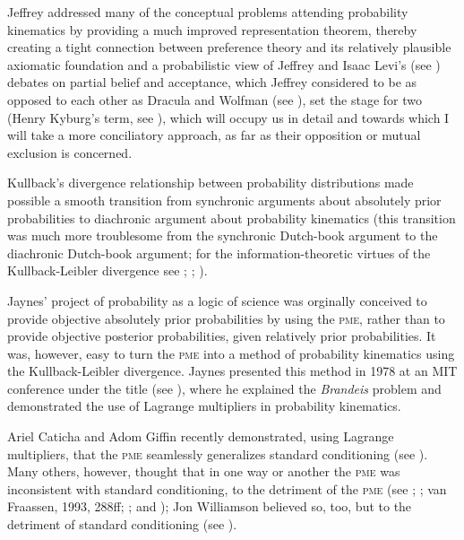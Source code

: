 \documentclass[11pt]{article}
\begin{document}
Jeffrey addressed many of the conceptual problems attending
probability kinematics by providing a much improved representation
theorem, thereby creating a tight connection between preference theory
and its relatively plausible axiomatic foundation and a probabilistic
view of  Jeffrey and Isaac Levi's (see
) debates on partial belief and acceptance, which
Jeffrey considered to be as opposed to each other as Dracula and
Wolfman (see ), set the stage for two
 (Henry Kyburg's term, see
), which will occupy us in detail and towards
which I will take a more conciliatory approach, as far as their
opposition or mutual exclusion is concerned.

Kullback's divergence relationship between probability distributions
made possible a smooth transition from synchronic arguments about
absolutely prior probabilities to diachronic argument about
probability kinematics (this transition was much more troublesome from
the synchronic Dutch-book argument to the diachronic Dutch-book
argument; for the information-theoretic virtues of the
Kullback-Leibler divergence see ;
; ).

Jaynes' project of probability as a logic of science was orginally
conceived to provide objective absolutely prior probabilities by using
the \textsc{pme}, rather than to provide objective posterior
probabilities, given relatively prior probabilities. It was, however,
easy to turn the \textsc{pme} into a method of probability kinematics
using the Kullback-Leibler divergence. Jaynes presented this method in
1978 at an MIT conference under the title  (see ), where he explained
the \emph{Brandeis} problem and demonstrated the use of Lagrange
multipliers in probability kinematics.

Ariel Caticha and Adom Giffin recently demonstrated, using Lagrange
multipliers, that the \textsc{pme} seamlessly generalizes standard
conditioning (see ). Many others, however,
thought that in one way or another the \textsc{pme} was inconsistent
with standard conditioning, to the detriment of the \textsc{pme} (see
; ; van Fraassen,
1993, 288ff;
; and ); Jon
Williamson believed so, too, but to the detriment of standard
conditioning (see ).
\end{document}
